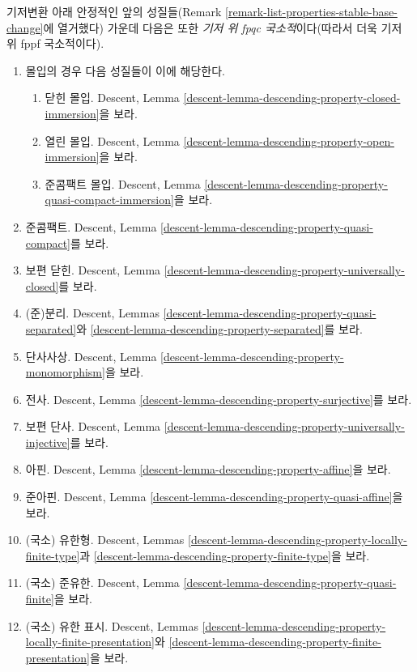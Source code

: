 \begin{remark}
\label{remark-list-properties-fpqc-local-base}
기저변환 아래 안정적인 앞의 성질들(Remark
\ref{remark-list-properties-stable-base-change}에 열거했다) 가운데
다음은 또한 {\it 기저 위 fpqc 국소적}이다(따라서 더욱 기저 위 fppf
국소적이다).
\begin{enumerate}
\item 몰입의 경우 다음 성질들이 이에 해당한다.
\begin{enumerate}
\item 닫힌 몰입. Descent, Lemma
\ref{descent-lemma-descending-property-closed-immersion}을 보라.
\item 열린 몰입. Descent, Lemma
\ref{descent-lemma-descending-property-open-immersion}을 보라.
\item 준콤팩트 몰입. Descent, Lemma
\ref{descent-lemma-descending-property-quasi-compact-immersion}을 보라.
\end{enumerate}
\item 준콤팩트. Descent, Lemma
\ref{descent-lemma-descending-property-quasi-compact}를 보라.
\item 보편 닫힌. Descent, Lemma
\ref{descent-lemma-descending-property-universally-closed}를 보라.
\item (준)분리. Descent, Lemmas
\ref{descent-lemma-descending-property-quasi-separated}와
\ref{descent-lemma-descending-property-separated}를 보라.
\item 단사사상. Descent, Lemma
\ref{descent-lemma-descending-property-monomorphism}을 보라.
\item 전사. Descent, Lemma
\ref{descent-lemma-descending-property-surjective}를 보라.
\item 보편 단사. Descent, Lemma
\ref{descent-lemma-descending-property-universally-injective}를 보라.
\item 아핀. Descent, Lemma
\ref{descent-lemma-descending-property-affine}을 보라.
\item 준아핀. Descent, Lemma
\ref{descent-lemma-descending-property-quasi-affine}을 보라.
\item (국소) 유한형. Descent, Lemmas
\ref{descent-lemma-descending-property-locally-finite-type}과
\ref{descent-lemma-descending-property-finite-type}을 보라.
\item (국소) 준유한. Descent, Lemma
\ref{descent-lemma-descending-property-quasi-finite}을 보라.
\item (국소) 유한 표시. Descent, Lemmas
\ref{descent-lemma-descending-property-locally-finite-presentation}와
\ref{descent-lemma-descending-property-finite-presentation}을 보라.

\end{enumerate}
\end{remark}
